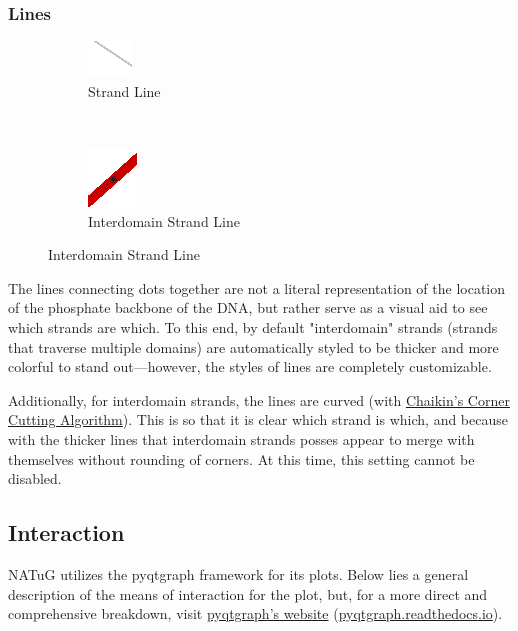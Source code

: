 \documentclass[titlepage]{article}
\begin{document}
	\subsubsection{Lines}

	\begin{figure}[h]
		\centering
		\caption{Side View Plot Line Graphics}
		\label{fig:side-view-plot-line-graphics}
		
		\begin{subfigure}{.4\linewidth}
			\centering
			\includegraphics[width=.3in]{strand-line.png}
			\caption{Strand Line}
			\label{fig:strand-line}
		\end{subfigure}%
		~
		\begin{subfigure}{.3\linewidth}
			\centering
			\includegraphics[width=.3in]{interdomain-strand-line.png}
			\caption{Interdomain Strand Line}
			\label{fig:interdomain-strand-line}
		\end{subfigure}
	\end{figure}

	The lines connecting dots together are not a literal representation of the location of the phosphate backbone of the DNA, but rather serve as a visual aid to see which strands are which. To this end, by default "interdomain" strands (strands that traverse multiple domains) are automatically styled to be thicker and more colorful to stand out—however, the styles of lines are completely customizable.
	
	Additionally, for interdomain strands, the lines are curved (with \href{https://www.cs.unc.edu/~dm/UNC/COMP258/LECTURES/Chaikins-Algorithm.pdf}{Chaikin's Corner Cutting Algorithm}). This is so that it is clear which strand is which, and because with the thicker lines that interdomain strands posses appear to merge with themselves without rounding of corners. At this time, this setting cannot be disabled.
	
	\subsection{Interaction} \label{sect:plot-interaction}
	NATuG utilizes the pyqtgraph framework for its plots. Below lies a general description of the means of interaction for the plot, but, for a more direct and comprehensive breakdown, visit \href{https://pyqtgraph.readthedocs.io/en/latest/user_guide/mouse_interaction.html}{pyqtgraph’s website} (\href{https://pyqtgraph.readthedocs.io/en/latest/user_guide/mouse_interaction.html}{pyqtgraph.readthedocs.io}).
	
\end{document}
